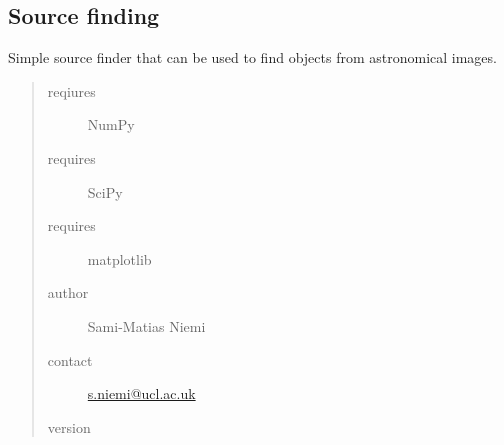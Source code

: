 \documentclass[a4paper,11pt,english]{sphinxmanual}
\begin{document}
\label{analysis:module-analysis.sourceFinder}

\subsection{Source finding}
\label{analysis:source-finding}
Simple source finder that can be used to find objects from astronomical images.
\begin{quote}\begin{description}
\item[{reqiures}] \leavevmode
NumPy

\item[{requires}] \leavevmode
SciPy

\item[{requires}] \leavevmode
matplotlib

\item[{author}] \leavevmode
Sami-Matias Niemi

\item[{contact}] \leavevmode
\href{mailto:s.niemi@ucl.ac.uk}{s.niemi@ucl.ac.uk}

\item[{version}] 

\end{description}\end{quote}
\end{document}
